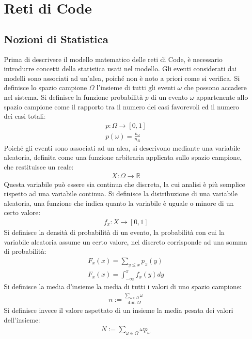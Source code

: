 \documentclass{article}
\numberwithin{equation}{subsection}
\begin{document}
\clearpage

\section{Reti di Code}

\subsection{Nozioni di Statistica}

Prima di descrivere il modello matematico delle reti di Code, è necessario introdurre concetti della statistica usati nel modello. Gli eventi considerati dai modelli sono 
associati ad un'alea, poiché non è noto a priori come si verifica. Si definisce lo spazio campione $\Omega$ l'insieme di tutti gli eventi $\omega$ che possono accadere nel 
sistema. Si definisce la funzione probabilità $p$ di un evento $\omega$ appartenente allo spazio campione come il rapporto tra il numero dei casi favorevoli ed il numero dei casi 
totali:
\begin{gather*}
    p:\Omega\to[0,1]\\
    p(\omega)=\displaystyle\frac{n_{\omega}}{n_{\Omega}}
\end{gather*}
Poiché gli eventi sono associati ad un alea, si descrivono mediante una variabile aleatoria, definita come una funzione arbitraria applicata sullo spazio campione, che 
restituisce un reale:
\begin{gather*}
    X:\Omega\to\mathbb{R}
\end{gather*}
Questa variabile può essere sia continua che discreta, la cui analisi è più semplice rispetto ad una variabile continua. 
Si definisce la distribuzione di una variabile aleatoria, una funzione che indica quanto la variabile è uguale o minore di un certo valore:
\begin{gather*}
    f_x:X\to[0,1]
\end{gather*}
Si definisce la densità di probabilità di un evento, la probabilità con cui la variabile aleatoria assume un certo valore, nel discreto corrisponde ad una somma di probabilità:
\begin{gather*}
    F_x(x)=\displaystyle\sum_{y\leq x}p_x(y)\\
    F_x(x)=\displaystyle\int_{-\infty}^xf_x(y)dy
\end{gather*}
Si definisce la media d'insieme la media di tutti i valori di uno spazio campione:
\begin{gather*}
    n:=\displaystyle\frac{\displaystyle\sum_{\omega\in\Omega}\omega}{\dim\Omega}
\end{gather*}
Si definisce invece il valore aspettato di un insieme la media pesata dei valori dell'insieme:
\begin{gather*}
    N:=\displaystyle\sum_{\omega\in\Omega}\omega p_\omega
\end{gather*}
\end{document}

